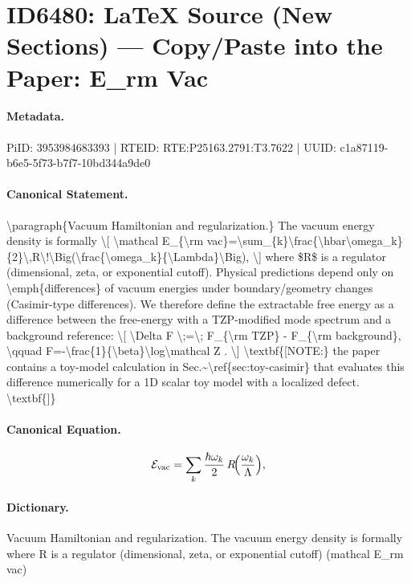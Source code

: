 \section*{ID6480: LaTeX Source (New Sections) — Copy/Paste into the Paper: E\_rm Vac}
\paragraph{Metadata.}
PiID: 3953984683393 | RTEID: RTE:P25163.2791:T3.7622 | UUID: c1a87119-b6e5-5f73-b7f7-10bd344a9de0

\paragraph{Canonical Statement.}
\textbackslash{}paragraph\{Vacuum Hamiltonian and regularization.\} The vacuum energy density is formally \textbackslash{}[ \textbackslash{}mathcal E\_\{\textbackslash{}rm vac\}=\textbackslash{}sum\_\{k\}\textbackslash{}frac\{\textbackslash{}hbar\textbackslash{}omega\_k\}\{2\}\textbackslash{},R\textbackslash{}!\textbackslash{}Big(\textbackslash{}frac\{\textbackslash{}omega\_k\}\{\textbackslash{}Lambda\}\textbackslash{}Big), \textbackslash{}] where \$R\$ is a regulator (dimensional, zeta, or exponential cutoff). Physical predictions depend only on \textbackslash{}emph\{differences\} of vacuum energies under boundary/geometry changes (Casimir-type differences). We therefore define the extractable free energy as a difference between the free-energy with a TZP-modified mode spectrum and a background reference: \textbackslash{}[ \textbackslash{}Delta F \textbackslash{};=\textbackslash{}; F\_\{\textbackslash{}rm TZP\} - F\_\{\textbackslash{}rm background\}, \textbackslash{}qquad F=-\textbackslash{}frac\{1\}\{\textbackslash{}beta\}\textbackslash{}log\textbackslash{}mathcal Z . \textbackslash{}] \textbackslash{}textbf\{[NOTE:\} the paper contains a toy-model calculation in Sec.\textasciitilde{}\textbackslash{}ref\{sec:toy-casimir\} that evaluates this difference numerically for a 1D scalar toy model with a localized defect. \textbackslash{}textbf\{]\}

\paragraph{Canonical Equation.}
\[
\mathcal E_{\rm vac}=\sum_{k}\frac{\hbar\omega_k}{2}\,R\!\Big(\frac{\omega_k}{\Lambda}\Big),
\]

\paragraph{Dictionary.}
Vacuum Hamiltonian and regularization. The vacuum energy density is formally where R is a regulator (dimensional, zeta, or exponential cutoff) (mathcal E\_rm vac)

